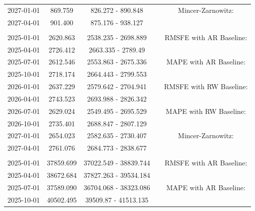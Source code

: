 \begin{table}
\begin{tabular}[t]{ccccc}
\hspace{1em}2027-01-01 & 869.759 & 826.272 - 890.848 &  & Mincer-Zarnowitz:\\
\hspace{1em}2027-04-01 & 901.400 & 875.176 - 938.127 &  & \\
\addlinespace[0.3em]
\multicolumn{5}{l}{\textbf{EmiCO2RoaTra}}\\
\hspace{1em}2025-01-01 & 2620.863 & 2538.235 - 2698.889 &  & RMSFE with AR Baseline:\\
\hspace{1em}2025-04-01 & 2726.412 & 2663.335 - 2789.49 &  & \\
\hspace{1em}2025-07-01 & 2612.546 & 2553.863 - 2675.336 &  & MAPE with AR Baseline:\\
\hspace{1em}2025-10-01 & 2718.174 & 2664.443 - 2799.553 &  & \\
\hspace{1em}2026-01-01 & 2637.229 & 2579.642 - 2704.941 &  & RMSFE with RW Baseline:\\
\hspace{1em}2026-04-01 & 2743.523 & 2693.988 - 2826.342 &  & \\
\hspace{1em}2026-07-01 & 2629.024 & 2549.495 - 2695.529 &  & MAPE with RW Baseline:\\
\hspace{1em}2026-10-01 & 2735.401 & 2688.847 - 2807.129 &  & \\
\hspace{1em}2027-01-01 & 2654.023 & 2582.635 - 2730.407 &  & Mincer-Zarnowitz:\\
\hspace{1em}2027-04-01 & 2761.076 & 2684.773 - 2838.677 &  & \\
\addlinespace[0.3em]
\multicolumn{5}{l}{\textbf{RealConsHH}}\\
\hspace{1em}2025-01-01 & 37859.699 & 37022.549 - 38839.744 &  & RMSFE with AR Baseline:\\
\hspace{1em}2025-04-01 & 38672.684 & 37827.263 - 39534.184 &  & \\
\hspace{1em}2025-07-01 & 37589.090 & 36704.068 - 38323.086 &  & MAPE with AR Baseline:\\
\hspace{1em}2025-10-01 & 40502.495 & 39509.87 - 41513.135 &  & \\

\end{tabular}
\end{table}

